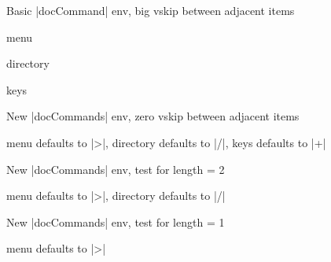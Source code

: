 \documentclass{article}
\begin{document}
\begin{example}{Basic |docCommand| env, big vskip between adjacent items}
  
  \begin{docCommand}
    [doc description=\oarg{input sep} defaults to |>|]
    {menu}
    {}
  \end{docCommand}
  \begin{docCommand}{directory}{}
  \end{docCommand}
  \begin{docCommand}{keys}{}
    \lipsum[23]
  \end{docCommand}
\end{example}


\begin{example}{New |docCommands| env, zero vskip between adjacent items}
  \begin{docCommands}{
    {menu}
      {}
      { defaults to |>|},
    {directory}
      {}
      { defaults to |/|},
    {keys}
      {}
      { defaults to |+|}}
    \lipsum[23]
  \end{docCommands}
\end{example}

\begin{example}{New |docCommands| env, test for length = 2}
  \begin{docCommands}{
    {menu}
      {}
      { defaults to |>|},
    {directory}
      {}
      { defaults to |/|}}
    \lipsum[23]
  \end{docCommands}
\end{example}

\begin{example}{New |docCommands| env, test for length = 1}
  \begin{docCommands}{
    {menu}
      {}
      { defaults to |>|}}
    \lipsum[23]
  \end{docCommands}
\end{example}
\end{document}
